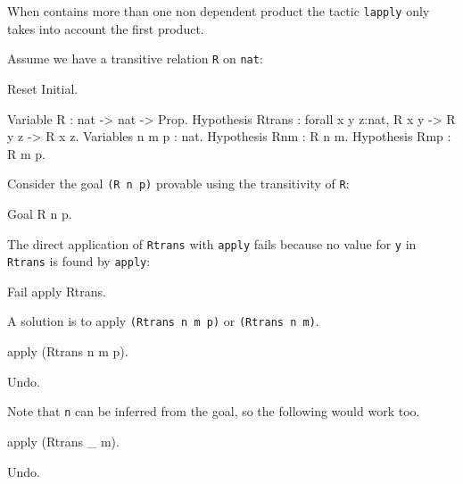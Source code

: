\begin{coq_example*}
\begin{Variants}
  \Warning When {\term} contains more than one non
  dependent product the tactic {\tt lapply} only takes into account the
  first product.

\end{Variants}

\Example
Assume we have a transitive relation {\tt R} on {\tt nat}:
\label{eapply-example}

\begin{coq_eval}
Reset Initial.
\end{coq_eval}
\begin{coq_example*}
Variable R : nat -> nat -> Prop.
Hypothesis Rtrans : forall x y z:nat, R x y -> R y z -> R x z.
Variables n m p : nat.
Hypothesis Rnm : R n m.
Hypothesis Rmp : R m p.
\end{coq_example*}

Consider the goal {\tt (R n p)} provable using the transitivity of
{\tt R}:

\begin{coq_example*}
Goal R n p.
\end{coq_example*}

The direct application of {\tt Rtrans} with {\tt apply} fails because
no value for {\tt y} in {\tt Rtrans} is found by {\tt apply}:

\begin{coq_example}
Fail apply Rtrans.
\end{coq_example}

A solution is to apply {\tt (Rtrans n m p)} or {\tt (Rtrans n m)}.

\begin{coq_example}
apply (Rtrans n m p).
\end{coq_example}

\begin{coq_eval}
Undo.
\end{coq_eval}

Note that {\tt n} can be inferred from the goal, so the following would
work too.

\begin{coq_example*}
apply (Rtrans _ m).
\end{coq_example*}
\begin{coq_eval}
Undo.
\end{coq_eval}


\end{coq_example*}

